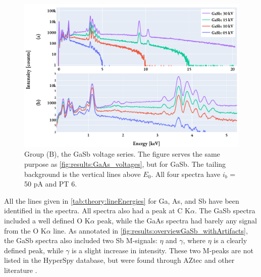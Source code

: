 \begin{figure}[hbtp]
    \centering
    \includegraphics[width=0.85\linewidth]{figures/results/GaSb_voltages.pdf}
    \caption{
        Group (B), the GaSb voltage series.
        The figure serves the same purpose as \cref{fig:results:GaAs_voltages}, but for GaSb.
        The tailing background is the vertical lines above $E_0$.
        All four spectra have $i_b$ = 50 pA and PT 6.
    }
    \label{fig:results:GaSb_voltages}
\end{figure}






All the lines given in \cref{tab:theory:lineEnergies} for Ga, As, and Sb have been identified in the spectra.
All spectra also had a peak at C K$\alpha$.
The GaSb spectra included a well defined O K$\alpha$ peak, while the GaAs spectra had barely any signal from the O K$\alpha$ line.
As annotated in \cref{fig:results:overviewGaSb_withArtifacts}, the GaSb spectra also included two Sb M-signals: $\eta$ and $\gamma$, where $\eta$ is a clearly defined peak, while $\gamma$ is a slight increase in intensity.
These two M-peaks are not listed in the HyperSpy database, but were found through AZtec \cite{aztec_manual} and other literature \cite{liao2006practical}.



